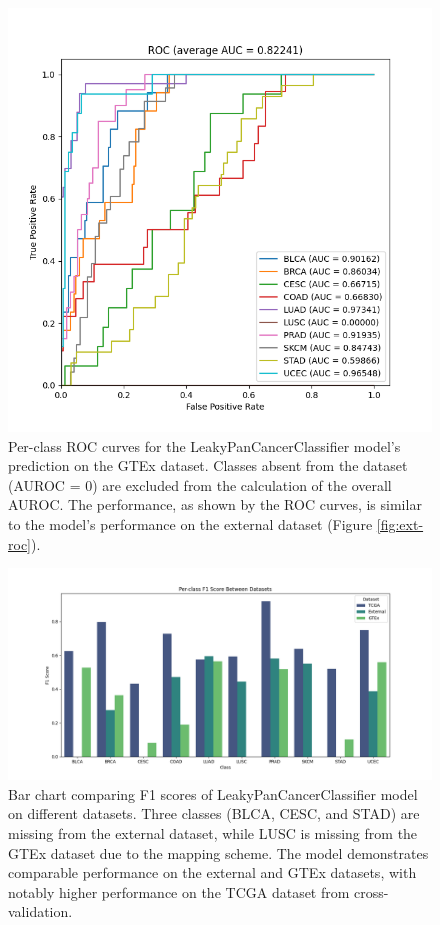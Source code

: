 \documentclass{l4proj}
\begin{document}
\begin{appendices}
\begin{figure}
    \centering
    \includegraphics[width=0.75\linewidth]{images/gtex_roc.png}
    \caption{Per-class ROC curves for the LeakyPanCancerClassifier model's prediction on the GTEx dataset. Classes absent from the dataset (AUROC = 0) are excluded from the calculation of the overall AUROC. The performance, as shown by the ROC curves, is similar to the model's performance on the external dataset (Figure \ref{fig:ext-roc}).}
    \label{fig:gtex-roc}
\end{figure}

\begin{figure}
    \centering
    \includegraphics[width=1\linewidth]{images/f1_datasets.png}
    \caption{Bar chart comparing F1 scores of LeakyPanCancerClassifier model on different datasets. Three classes (BLCA, CESC, and STAD) are missing from the external dataset, while LUSC is missing from the GTEx dataset due to the mapping scheme. The model demonstrates comparable performance on the external and GTEx datasets, with notably higher performance on the TCGA dataset from cross-validation.}
    \label{fig:enter-label}
\end{figure}


\end{appendices}
\end{document}
